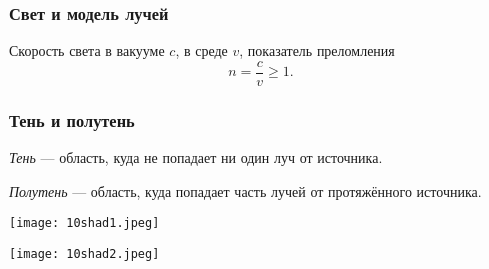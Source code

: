 \documentclass[12pt, a4paper]{article}
\begin{document}
\subsubsection*{Свет и модель лучей}
Скорость света в вакууме $c$, в среде $v$, показатель преломления
\[
n = \frac{c}{v} \ge 1.
\]

\subsubsection*{Тень и полутень}
\textit{Тень} --- область, куда не попадает ни один луч от источника.

\textit{Полутень} --- область, куда попадает часть лучей от протяжённого источника.

\begin{center}
\texttt{[image: 10shad1.jpeg]}
\end{center}

\begin{center}
\texttt{[image: 10shad2.jpeg]}
\end{center}
\end{document}
